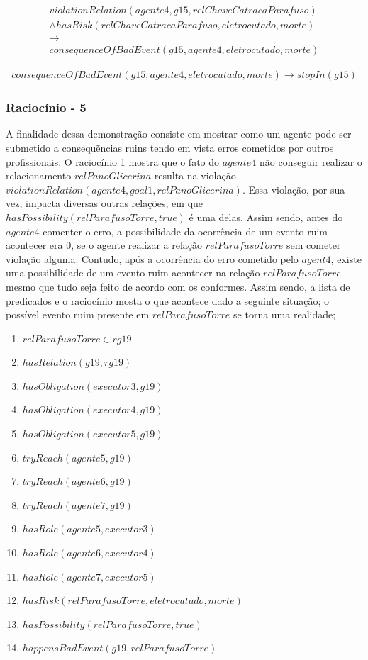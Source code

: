 \documentclass[12pt]{article}
\begin{document}
\begin{eqnarray}\nonumber
	violationRelation(agente4,g15,relChaveCatracaParafuso) \nonumber \\ 
	 \wedge hasRisk(relChaveCatracaParafuso,eletrocutado,morte) \nonumber \\ 
	\to \nonumber \\ 
	consequenceOfBadEvent(g15,agente4,eletrocutado,morte)
\end{eqnarray}

\begin{eqnarray}
	consequenceOfBadEvent(g15,agente4,eletrocutado,morte) \to stopIn(g15)
\end{eqnarray}

\subsubsection{Raciocínio - 5} 

A finalidade dessa demonstração consiste em mostrar como um agente pode ser submetido a consequẽncias ruins tendo em vista erros cometidos por outros profissionais. O raciocínio 1 mostra que o fato do $agente4$ não conseguir realizar o relacionamento $relPanoGlicerina$ resulta na violação $violationRelation(agente4,goal1,relPanoGlicerina)$. Essa violação, por sua vez, impacta diversas outras relações, em que $hasPossibility(relParafusoTorre,true)$ é uma delas. Assim sendo, antes do $agente4$ comenter o erro, a possibilidade da ocorrência de um evento ruim acontecer era 0, se o agente realizar a relação $relParafusoTorre$ sem cometer violação alguma. Contudo, após a ocorrência do erro cometido pelo $agent4$, existe uma possibilidade de um evento ruim acontecer na relação $relParafusoTorre$ mesmo que tudo seja feito de acordo com os conformes. Assim sendo, a lista de predicados e o raciocínio mosta o que acontece dado a seguinte situação; o possível evento ruim presente em $relParafusoTorre$ se torna uma realidade;  

\begin{enumerate}
	\item $relParafusoTorre \in rg19$	
	\item $hasRelation(g19,rg19)$		
	\item $hasObligation(executor3,g19)$
	\item $hasObligation(executor4,g19)$
	\item $hasObligation(executor5,g19)$		
	\item $tryReach(agente5,g19)$
	\item $tryReach(agente6,g19)$
	\item $tryReach(agente7,g19)$									
	\item $hasRole(agente5,executor3)$
	\item $hasRole(agente6,executor4)$
	\item $hasRole(agente7,executor5)$
	\item $hasRisk(relParafusoTorre,eletrocutado,morte)$
	\item $hasPossibility(relParafusoTorre,true)$
	\item $happensBadEvent(g19,relParafusoTorre)$	
\end{enumerate}
\end{document}
